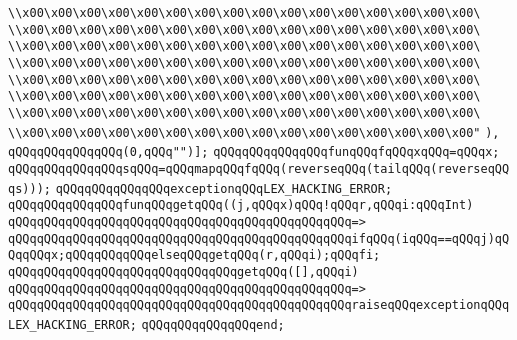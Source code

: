 \verb|\\x00\x00\x00\x00\x00\x00\x00\x00\x00\x00\x00\x00\x00\x00\x00\x00\|\newline
\verb|\\x00\x00\x00\x00\x00\x00\x00\x00\x00\x00\x00\x00\x00\x00\x00\x00\|\newline
\verb|\\x00\x00\x00\x00\x00\x00\x00\x00\x00\x00\x00\x00\x00\x00\x00\x00\|\newline
\verb|\\x00\x00\x00\x00\x00\x00\x00\x00\x00\x00\x00\x00\x00\x00\x00\x00\|\newline
\verb|\\x00\x00\x00\x00\x00\x00\x00\x00\x00\x00\x00\x00\x00\x00\x00\x00\|\newline
\verb|\\x00\x00\x00\x00\x00\x00\x00\x00\x00\x00\x00\x00\x00\x00\x00\x00\|\newline
\verb|\\x00\x00\x00\x00\x00\x00\x00\x00\x00\x00\x00\x00\x00\x00\x00\x00\|\newline
\verb|\\x00\x00\x00\x00\x00\x00\x00\x00\x00\x00\x00\x00\x00\x00\x00\x00"|\newline
\verb|),|\newline
\verb|qQQqqQQqqQQqqQQq(0,qQQq"")];|\newline
\verb|qQQqqQQqqQQqqQQqfunqQQqfqQQqxqQQq=qQQqx;|\newline
\verb|qQQqqQQqqQQqqQQqsqQQq=qQQqmapqQQqfqQQq(reverseqQQq(tailqQQq(reverseqQQqs)));|\newline
\verb|qQQqqQQqqQQqqQQqexceptionqQQqLEX_HACKING_ERROR;|\newline
\verb|qQQqqQQqqQQqqQQqfunqQQqgetqQQq((j,qQQqx)qQQq!qQQqr,qQQqi:qQQqInt)|\newline
\verb|qQQqqQQqqQQqqQQqqQQqqQQqqQQqqQQqqQQqqQQqqQQqqQQq=>|\newline
\verb|qQQqqQQqqQQqqQQqqQQqqQQqqQQqqQQqqQQqqQQqqQQqqQQqifqQQq(iqQQq==qQQqj)qQQqqQQqx;qQQqqQQqqQQqelseqQQqgetqQQq(r,qQQqi);qQQqfi;|\newline
\newline
\verb|qQQqqQQqqQQqqQQqqQQqqQQqqQQqqQQqgetqQQq([],qQQqi)|\newline
\verb|qQQqqQQqqQQqqQQqqQQqqQQqqQQqqQQqqQQqqQQqqQQqqQQq=>|\newline
\verb|qQQqqQQqqQQqqQQqqQQqqQQqqQQqqQQqqQQqqQQqqQQqqQQqraiseqQQqexceptionqQQqLEX_HACKING_ERROR;|\newline
\verb|qQQqqQQqqQQqqQQqend;|\newline
